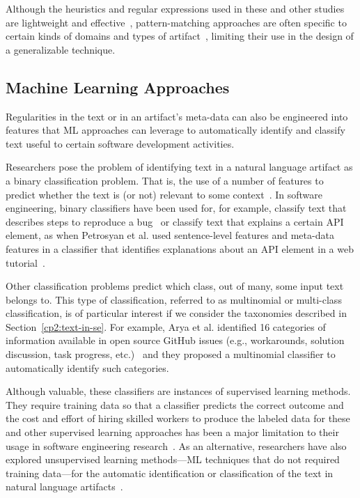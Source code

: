 Although the heuristics and regular expressions used in these and other studies~\cite{nadi2020, Maalej2013}
are lightweight and effective~\cite{Bavota2016}, 
pattern-matching approaches 
are often specific to certain kinds of domains and types of artifact~\cite{fucci2019}, 
limiting their use in the design of a generalizable technique.







\subsection{Machine Learning Approaches}
\label{cp2:machine-learning}


Regularities in the text or in an artifact's meta-data can also be 
engineered into features that \acf{ML} 
approaches can leverage to automatically identify and classify
text useful to certain software development activities. 



Researchers pose the problem of identifying text 
in a natural language artifact 
as a binary classification problem. 
That is, the use of a number of features 
to predict whether the text is (or not)
relevant to some context~\cite{aa}.
In software engineering, 
binary classifiers have been used for,
for example, classify text that describes steps to reproduce a bug~\cite{Chaparro2016} or 
classify text that explains a certain API element, as when 
Petrosyan et al. used 
 sentence-level features
and meta-data features in a classifier 
that 
identifies explanations about an API element  in a web tutorial~\cite{Petrosyan2015}.




Other classification problems predict which class, out of many, some input text belongs to. 
This type of classification, referred to as multinomial or multi-class classification, 
is of particular interest if 
we consider the taxonomies described in Section~\ref{cp2:text-in-se}.
For example, Arya et al. identified 16 categories of  information available
in open source GitHub issues (e.g., workarounds, solution discussion, task progress, etc.)~\cite{Arya2019}
and they proposed a multinomial classifier 
to automatically identify such categories.








Although valuable, these classifiers are instances of supervised learning methods.
They require training data so that a classifier predicts the correct outcome 
and the cost and effort of hiring skilled workers to produce 
the labeled data for these and other supervised learning approaches
has been a major limitation to their usage in software engineering research~\cite{Arpteg2018, ferreira2021}. As an alternative,
researchers have also explored 
 unsupervised learning methods---\acs{ML} techniques that do not required training data---for the automatic 
identification or classification of the text in natural language artifacts~\cite{aa}.





